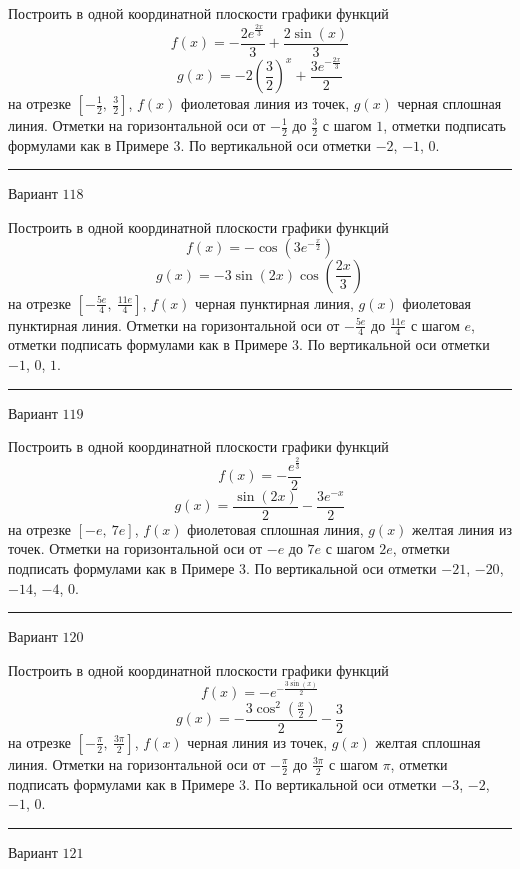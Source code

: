 \documentclass[11pt]{report}
\begin{document}
Построить в одной координатной плоскости графики функций $$f(x) = - \frac{2 e^{\frac{2 x}{3}}}{3} + \frac{2 \sin{\left(x \right)}}{3}$$ $$g(x) = - 2 \left(\frac{3}{2}\right)^{x} + \frac{3 e^{- \frac{2 x}{3}}}{2}$$ на отрезке $\left[- \frac{1}{2}, \  \frac{3}{2}\right]$, $f(x)$ фиолетовая линия из точек, $g(x)$ черная сплошная линия. Отметки на горизонтальной оси от $- \frac{1}{2}$ до $\frac{3}{2}$ с шагом $1$, отметки подписать формулами как в Примере 3. По вертикальной оси отметки $-2$, $-1$, $0$.
\begin{center}
\noindent\rule{8cm}{0.4pt}
\end{center}
Вариант $118$


Построить в одной координатной плоскости графики функций $$f(x) = - \cos{\left(3 e^{- \frac{x}{2}} \right)}$$ $$g(x) = - 3 \sin{\left(2 x \right)} \cos{\left(\frac{2 x}{3} \right)}$$ на отрезке $\left[- \frac{5 e}{4}, \  \frac{11 e}{4}\right]$, $f(x)$ черная пунктирная линия, $g(x)$ фиолетовая пунктирная линия. Отметки на горизонтальной оси от $- \frac{5 e}{4}$ до $\frac{11 e}{4}$ с шагом $e$, отметки подписать формулами как в Примере 3. По вертикальной оси отметки $-1$, $0$, $1$.
\begin{center}
\noindent\rule{8cm}{0.4pt}
\end{center}
Вариант $119$


Построить в одной координатной плоскости графики функций $$f(x) = - \frac{e^{\frac{2}{3}}}{2}$$ $$g(x) = \frac{\sin{\left(2 x \right)}}{2} - \frac{3 e^{- x}}{2}$$ на отрезке $\left[- e, \  7 e\right]$, $f(x)$ фиолетовая сплошная линия, $g(x)$ желтая линия из точек. Отметки на горизонтальной оси от $- e$ до $7 e$ с шагом $2 e$, отметки подписать формулами как в Примере 3. По вертикальной оси отметки $-21$, $-20$, $-14$, $-4$, $0$.
\begin{center}
\noindent\rule{8cm}{0.4pt}
\end{center}
Вариант $120$


Построить в одной координатной плоскости графики функций $$f(x) = - e^{- \frac{3 \sin{\left(x \right)}}{2}}$$ $$g(x) = - \frac{3 \cos^{2}{\left(\frac{x}{2} \right)}}{2} - \frac{3}{2}$$ на отрезке $\left[- \frac{\pi}{2}, \  \frac{3 \pi}{2}\right]$, $f(x)$ черная линия из точек, $g(x)$ желтая сплошная линия. Отметки на горизонтальной оси от $- \frac{\pi}{2}$ до $\frac{3 \pi}{2}$ с шагом $\pi$, отметки подписать формулами как в Примере 3. По вертикальной оси отметки $-3$, $-2$, $-1$, $0$.
\begin{center}
\noindent\rule{8cm}{0.4pt}
\end{center}
Вариант $121$
\end{document}

